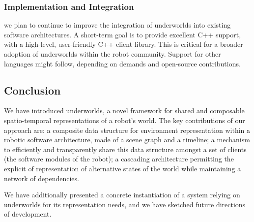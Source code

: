 \documentclass[letterpaper, 10pt, conference]{ieeeconf}
\newcommand{\uwds}{{\sc underworlds}\xspace}
\begin{document}
{\subsubsection{Implementation and Integration} we plan to continue to
improve the integration of \uwds into existing software architectures. A
short-term goal is to provide excellent C++ support, with a high-level,
user-friendly C++ client library. This is critical for a broader adoption of \uwds
within the robot community. Support for other languages might follow, depending
on demands and open-source contributions.



\subsection{Conclusion}

We have introduced \uwds, a novel framework for shared and composable
spatio-temporal representations of a robot's world. The key contributions of our
approach are: a composite data structure for environment representation within a
robotic software architecture, made of a scene graph and a timeline; a mechanism
to efficiently and transparently share this data structure amongst a set of
clients (the software modules of the robot); a cascading architecture permitting
the explicit of representation of alternative states of the world while
maintaining a network of dependencies.

We have additionally presented a concrete instantiation of a system relying on \uwds
for its representation needs, and we have sketched future directions of
development.

}
\end{document}
